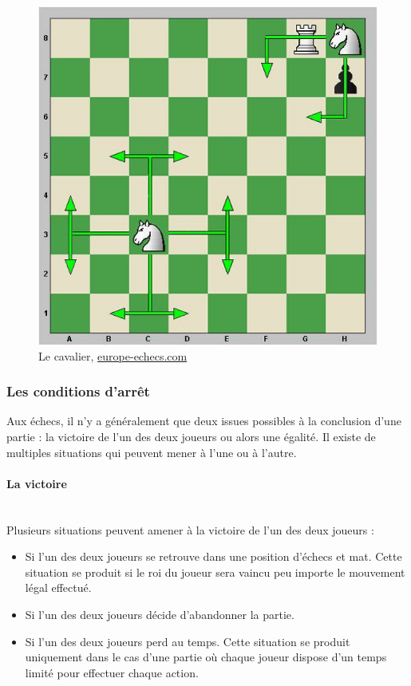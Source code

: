 \huge\documentclass{article}
\begin{document}
    \begin{figure}[h]
        \centering
        \includegraphics[scale=0.5]{img/mouvements_cavalier.jpg}
        \caption{Le cavalier,
            \href{https://www.europe-echecs.com/art/2-le-deplacement-des-pieces-93.html}{europe-echecs.com}}
    \end{figure}


    \subsubsection{Les conditions d'arrêt}\label{condition d'arret}

    Aux échecs, il n'y a généralement que deux issues possibles à la conclusion d'une partie : la victoire de l'un des deux joueurs ou alors une égalité. Il existe de multiples situations qui peuvent mener à l'une ou à l'autre.

    \paragraph{La victoire}
    ~~\\

    Plusieurs situations peuvent amener à la victoire de l'un des deux joueurs :
    \newline

    \begin{itemize}
        \item Si l'un des deux joueurs se retrouve dans une position d'échecs et mat. Cette situation se produit si le roi du joueur sera vaincu peu importe le mouvement légal effectué.
        \item Si l'un des deux joueurs décide d'abandonner la partie.
        \item Si l'un des deux joueurs perd au temps. Cette situation se produit uniquement dans le cas d'une partie où chaque joueur dispose d'un temps limité pour effectuer chaque action.
    \end{itemize}
\end{document}
